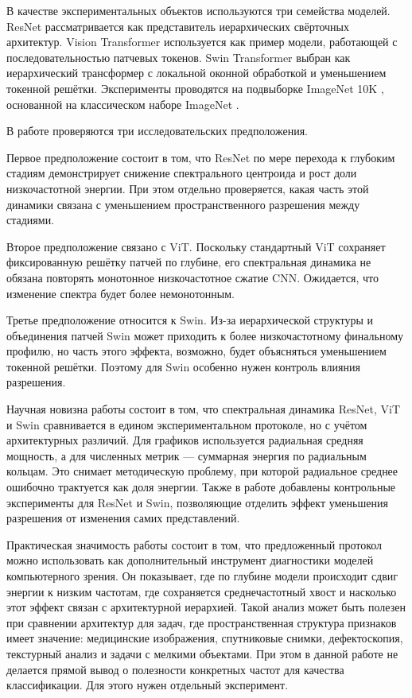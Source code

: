В качестве экспериментальных объектов используются три семейства моделей. ResNet рассматривается как представитель иерархических свёрточных архитектур. Vision Transformer используется как пример модели, работающей с последовательностью патчевых токенов. Swin Transformer выбран как иерархический трансформер с локальной оконной обработкой и уменьшением токенной решётки. Эксперименты проводятся на подвыборке ImageNet 10K \cite{priyerana_imagenet10k}, основанной на классическом наборе ImageNet \cite{deng2009imagenet}.

В работе проверяются три исследовательских предположения.

Первое предположение состоит в том, что ResNet по мере перехода к глубоким стадиям демонстрирует снижение спектрального центроида и рост доли низкочастотной энергии. При этом отдельно проверяется, какая часть этой динамики связана с уменьшением пространственного разрешения между стадиями.

Второе предположение связано с ViT. Поскольку стандартный ViT сохраняет фиксированную решётку патчей по глубине, его спектральная динамика не обязана повторять монотонное низкочастотное сжатие CNN. Ожидается, что изменение спектра будет более немонотонным.

Третье предположение относится к Swin. Из-за иерархической структуры и объединения патчей Swin может приходить к более низкочастотному финальному профилю, но часть этого эффекта, возможно, будет объясняться уменьшением токенной решётки. Поэтому для Swin особенно нужен контроль влияния разрешения.

Научная новизна работы состоит в том, что спектральная динамика ResNet, ViT и Swin сравнивается в едином экспериментальном протоколе, но с учётом архитектурных различий. Для графиков используется радиальная средняя мощность, а для численных метрик — суммарная энергия по радиальным кольцам. Это снимает методическую проблему, при которой радиальное среднее ошибочно трактуется как доля энергии. Также в работе добавлены контрольные эксперименты для ResNet и Swin, позволяющие отделить эффект уменьшения разрешения от изменения самих представлений.

Практическая значимость работы состоит в том, что предложенный протокол можно использовать как дополнительный инструмент диагностики моделей компьютерного зрения. Он показывает, где по глубине модели происходит сдвиг энергии к низким частотам, где сохраняется среднечастотный хвост и насколько этот эффект связан с архитектурной иерархией. Такой анализ может быть полезен при сравнении архитектур для задач, где пространственная структура признаков имеет значение: медицинские изображения, спутниковые снимки, дефектоскопия, текстурный анализ и задачи с мелкими объектами. При этом в данной работе не делается прямой вывод о полезности конкретных частот для качества классификации. Для этого нужен отдельный эксперимент.

